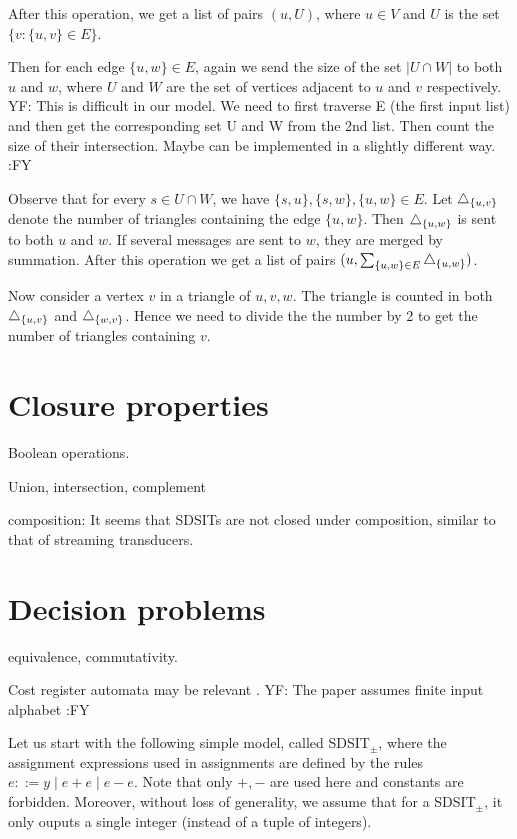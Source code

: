 \documentclass[11pt]{article}
\newcommand{\yfc}[1]{\color{blue} {YF: #1 :FY} \color{black}}
\begin{document}
{After this operation, we get a list of pairs $(u, U)$, where $u \in V$ and $U$ is the set $\{ v : \{ u, v \} \in E \}$.

Then for each edge $\{ u, w \} \in E$, again we send the size of the set $| U \cap W |$ to both $u$ and $w$, where $U$ and $W$ are
the set of vertices adjacent to $u$ and $v$ respectively. 
\yfc{This is difficult in our model. We need to first traverse E (the first input list) and then get the corresponding set U and W from the 2nd list. Then count the size of their intersection. Maybe can be implemented in a slightly different way.}

Observe that for every $s \in U \cap W$, we have $\{ s, u \}, \{ s, w \}, \{ u, w
\} \in E$. Let $\triangle_{\{u, v\}}$ denote the number of triangles
containing the edge $\{ u, w \}$. Then $\triangle_{\{u, w\}}$ is sent to
both $u$ and $w$. If several messages are sent to $w$, they are merged
by summation. After this operation we get a list of pairs $(u, \sum_{\{ u, w \} \in E} \triangle_{\{u, w\}})$.

Now consider a vertex $v$ in a triangle of $u, v, w$. The triangle is
counted in both $\triangle_{\{ u, v \}}$ and $\triangle_{\{ w, v \}}$. Hence
we need to divide the the number by 2 to get the number of triangles containing $v$. }


\section{Closure properties}

Boolean operations.

Union, intersection, complement

composition: It seems that SDSITs are not closed under composition, similar to that of streaming transducers.

\section{Decision problems}

equivalence, commutativity.

Cost register automata may be relevant \cite{ADD+13}. 
\yfc{The paper assumes finite input alphabet}

Let us start with the following simple model, called SDSIT$_{\pm}$, where the assignment expressions used in assignments are defined by the rules $e::= y \mid e+e \mid e - e$. Note that only $+,-$ are used here and constants are forbidden. Moreover, without loss of generality, we assume that for a SDSIT$_{\pm}$, it only ouputs a single integer (instead of a tuple of integers).
\end{document}
